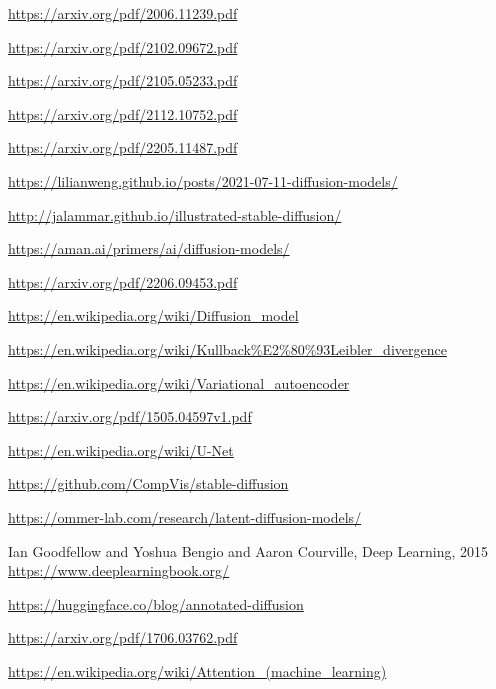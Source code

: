 \documentclass[11pt,a4paper]{report}
\begin{document}
\begin{thebibliography}{99}

\url{https://arxiv.org/pdf/2006.11239.pdf}

\url{https://arxiv.org/pdf/2102.09672.pdf}

\url{https://arxiv.org/pdf/2105.05233.pdf}

\url{https://arxiv.org/pdf/2112.10752.pdf}

\url{https://arxiv.org/pdf/2205.11487.pdf}
  
\url{ https://lilianweng.github.io/posts/2021-07-11-diffusion-models/}

\url{http://jalammar.github.io/illustrated-stable-diffusion/}

\url{https://aman.ai/primers/ai/diffusion-models/}

\url{https://arxiv.org/pdf/2206.09453.pdf}

\url{https://en.wikipedia.org/wiki/Diffusion_model}

\url{https://en.wikipedia.org/wiki/Kullback%E2%80%93Leibler_divergence}

\url{https://en.wikipedia.org/wiki/Variational_autoencoder}

\url{https://arxiv.org/pdf/1505.04597v1.pdf}

\url{https://en.wikipedia.org/wiki/U-Net}

\url{https://github.com/CompVis/stable-diffusion}

\url{https://ommer-lab.com/research/latent-diffusion-models/}

Ian Goodfellow and Yoshua Bengio and Aaron Courville, Deep Learning, 2015
\url{https://www.deeplearningbook.org/}

\url{https://huggingface.co/blog/annotated-diffusion}

\url{https://arxiv.org/pdf/1706.03762.pdf}

\url{https://en.wikipedia.org/wiki/Attention_(machine_learning)}


\end{thebibliography}
\end{document}
